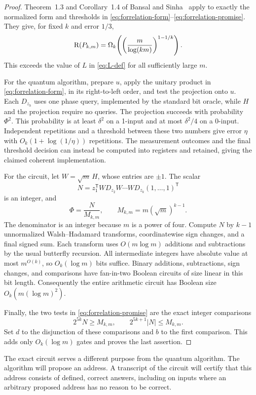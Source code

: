 \begin{proof}
Theorem~1.3 and Corollary~1.4 of Bansal and Sinha~\cite{BS21} apply to
exactly the normalized form and thresholds in
\eqref{eq:forrelation-form}--\eqref{eq:forrelation-promise}.  They give,
for fixed $k$ and error $1/3$,
\[
 \mathrm R(P_{k,m})=
 \Omega_k\!\left(
   \left(\frac{m}{\log(km)}\right)^{1-1/k}
 \right).
\]
This exceeds the value of $L$ in \eqref{eq:L-def} for all sufficiently
large $m$.

For the quantum algorithm, prepare $u$, apply the unitary product in
\eqref{eq:forrelation-form}, in its right-to-left order, and test the
projection onto $u$.  Each $D_{z_h}$ uses one phase query, implemented by
the standard bit oracle, while $H$ and the projection require no queries.
The projection succeeds with probability $\Phi^2$.  This probability is
at least $\delta^2$ on a 1-input and at most $\delta^2/4$ on a 0-input.
Independent repetitions and a threshold between these two numbers give
error $\eta$ with $O_k(1+\log(1/\eta))$ repetitions.  The measurement
outcomes and the final threshold decision can instead be computed into
registers and retained, giving the claimed coherent implementation.

For the circuit, let $W=\sqrt m\,H$, whose entries are $\pm1$.  The scalar
\[
 N=z_1^{\mathsf T}W D_{z_2}W\cdots W D_{z_k}(1,\ldots,1)^{\mathsf T}
\]
is an integer, and
\[
 \Phi=\frac{N}{M_{k,m}},
 \qquad M_{k,m}=m(\sqrt m)^{k-1}.
\]
The denominator is an integer because $m$ is a power of four.  Compute
$N$ by $k-1$ unnormalized Walsh--Hadamard transforms, coordinatewise sign
changes, and a final signed sum.  Each transform uses $O(m\log m)$
additions and subtractions by the usual butterfly recursion.  All
intermediate integers have absolute value at most $m^{O(k)}$, so
$O_k(\log m)$ bits suffice.  Binary additions, subtractions, sign changes,
and comparisons have fan-in-two Boolean circuits of size linear in this
bit length.  Consequently the entire arithmetic circuit has Boolean size
$O_k(m(\log m)^2)$.

Finally, the two tests in \eqref{eq:forrelation-promise} are the exact
integer comparisons
\[
 2^{5k}N\geq M_{k,m},
 \qquad 2^{5k+1}|N|\leq M_{k,m}.
\]
Set $d$ to the disjunction of these comparisons and $b$ to the first
comparison.  This adds only $O_k(\log m)$ gates and proves the last
assertion.
\end{proof}

The exact circuit serves a different purpose from the quantum algorithm.
The algorithm will propose an address.  A transcript of the circuit will
certify that this address consists of defined, correct answers, including
on inputs where an arbitrary proposed address has no reason to be correct.

